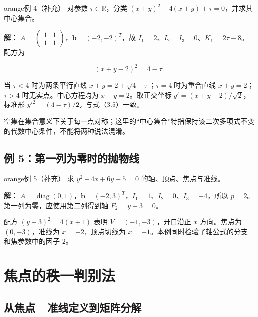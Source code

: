 \documentclass[11pt,a4paper]{article}
\begin{document}
\begin{sboxenv}{orange}{例 4（补充）}
对参数 \(\tau\in\mathbb R\)，分类
\((x+y)^2-4(x+y)+\tau=0\)，并求其中心集合。

\end{sboxenv}

\textbf{解：}
\(A=\begin{pmatrix}1&1\\1&1\end{pmatrix}\)，\(\boldsymbol b=(-2,-2)^T\)，故
\(I_1=2\)、\(I_2=I_3=0\)、\(K_1=2\tau-8\)。配方为

\begin{equation*}
(x+y-2)^2=4-\tau.
\end{equation*}

当 \(\tau<4\) 时为两条平行直线 \(x+y=2\pm\sqrt{4-\tau}\)；\(\tau=4\)
时为重合直线 \(x+y=2\)；\(\tau>4\) 时无实点。中心方程均为
\(x+y=2\)。取正交坐标 \(y'=(x+y-2)/\sqrt2\)，标准形
\(y'^2=(4-\tau)/2\)，与式（3.5）一致。

空集在集合意义下关于每一点对称；这里的``中心集合''特指保持该二次多项式不变的代数中心条件，不能将两种说法混淆。

\subsection{例
5：第一列为零时的抛物线}\label{ux4f8b-5ux7b2cux4e00ux5217ux4e3aux96f6ux65f6ux7684ux629bux7269ux7ebf}

\begin{sboxenv}{orange}{例 5（补充）}
求 \(y^2-4x+6y+5=0\) 的轴、顶点、焦点与准线。

\end{sboxenv}

\textbf{解：}
\(A=\operatorname{diag}(0,1)\)，\(\boldsymbol b=(-2,3)^T\)，\(I_1=1\)、\(I_2=0\)、\(I_3=-4\)，所以
\(p=2\)。第一列为零，应使用第二列得到轴 \(F_2=y+3=0\)。

配方 \((y+3)^2=4(x+1)\) 表明 \(V=(-1,-3)\)，开口沿正 \(x\) 方向。焦点为
\((0,-3)\)，准线为 \(x=-2\)，顶点切线为
\(x=-1\)。本例同时检验了轴公式的分支和焦参数中的因子 \(2\)。

\section{焦点的秩一判别法}\label{ux7126ux70b9ux7684ux79e9ux4e00ux5224ux522bux6cd5}

\subsection{从焦点---准线定义到矩阵分解}\label{ux4eceux7126ux70b9ux51c6ux7ebfux5b9aux4e49ux5230ux77e9ux9635ux5206ux89e3}
\end{document}
